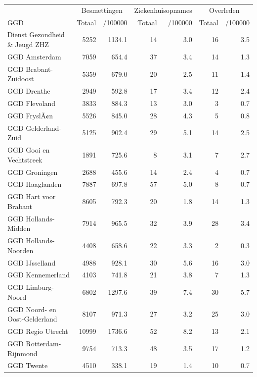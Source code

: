 \documentclass[
  english,
  man,floatsintext]{apa6}
\begin{document}
\begin{table}
\centering\begingroup\fontsize{10}{12}\selectfont

\begin{threeparttable}
\begin{tabular}{lrrrrrr}
\toprule
\multicolumn{1}{c}{ } & \multicolumn{2}{c}{Besmettingen} & \multicolumn{2}{c}{Ziekenhuisopnames} & \multicolumn{2}{c}{Overleden} \\
\cmidrule(l{3pt}r{3pt}){2-3} \cmidrule(l{3pt}r{3pt}){4-5} \cmidrule(l{3pt}r{3pt}){6-7}
GGD & Totaal & /100000 & Totaal & /100000 & Totaal & /100000\\
\midrule
Dienst Gezondheid \& Jeugd ZHZ & 5252 & 1134.1 & 14 & 3.0 & 16 & 3.5\\
GGD Amsterdam & 7059 & 654.4 & 37 & 3.4 & 14 & 1.3\\
GGD Brabant-Zuidoost & 5359 & 679.0 & 20 & 2.5 & 11 & 1.4\\
GGD Drenthe & 2949 & 592.8 & 17 & 3.4 & 12 & 2.4\\
GGD Flevoland & 3833 & 884.3 & 13 & 3.0 & 3 & 0.7\\
GGD FryslÃ¢n & 5526 & 845.0 & 28 & 4.3 & 5 & 0.8\\
GGD Gelderland-Zuid & 5125 & 902.4 & 29 & 5.1 & 14 & 2.5\\
GGD Gooi en Vechtstreek & 1891 & 725.6 & 8 & 3.1 & 7 & 2.7\\
GGD Groningen & 2688 & 455.6 & 14 & 2.4 & 4 & 0.7\\
GGD Haaglanden & 7887 & 697.8 & 57 & 5.0 & 8 & 0.7\\
GGD Hart voor Brabant & 8605 & 792.3 & 20 & 1.8 & 14 & 1.3\\
GGD Hollands-Midden & 7914 & 965.5 & 32 & 3.9 & 28 & 3.4\\
GGD Hollands-Noorden & 4408 & 658.6 & 22 & 3.3 & 2 & 0.3\\
GGD IJsselland & 4988 & 928.1 & 30 & 5.6 & 16 & 3.0\\
GGD Kennemerland & 4103 & 741.8 & 21 & 3.8 & 7 & 1.3\\
GGD Limburg-Noord & 6802 & 1297.6 & 39 & 7.4 & 30 & 5.7\\
GGD Noord- en Oost-Gelderland & 8107 & 971.3 & 27 & 3.2 & 25 & 3.0\\
GGD Regio Utrecht & 10999 & 1736.6 & 52 & 8.2 & 13 & 2.1\\
GGD Rotterdam-Rijnmond & 9754 & 713.3 & 48 & 3.5 & 17 & 1.2\\
GGD Twente & 4510 & 338.1 & 19 & 1.4 & 10 & 0.7\\

\end{tabular}
\end{threeparttable}
\end{table}
\end{document}
